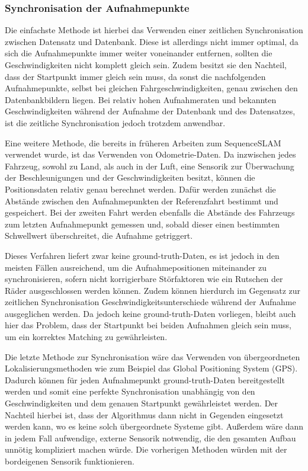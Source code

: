 \documentclass[12pt,a4paper,titlepage]{scrartcl}
\begin{document}
\subsubsection{Synchronisation der Aufnahmepunkte}
Die einfachste Methode ist hierbei das Verwenden einer zeitlichen Synchronisation zwischen Datensatz und Datenbank. Diese ist allerdings nicht immer optimal, da sich die Aufnahmepunkte immer weiter voneinander entfernen, sollten die Geschwindigkeiten nicht komplett gleich sein. Zudem besitzt sie den Nachteil, dass der Startpunkt immer gleich sein muss, da sonst die nachfolgenden Aufnahmepunkte, selbst bei gleichen Fahrgeschwindigkeiten, genau zwischen den Datenbankbildern liegen. Bei relativ hohen Aufnahmeraten und bekannten Geschwindigkeiten während der Aufnahme der Datenbank und des Datensatzes, ist die zeitliche Synchronisation jedoch trotzdem anwendbar.

Eine weitere Methode, die bereits in früheren Arbeiten zum SequenceSLAM verwendet wurde, ist das Verwenden von Odometrie-Daten. Da inzwischen jedes Fahrzeug, sowohl zu Land, als auch in der Luft, eine Sensorik zur Überwachung der Beschleunigungen und der Geschwindigkeiten besitzt, können die Positionsdaten relativ genau berechnet werden. Dafür werden zunächst die Abstände zwischen den Aufnahmepunkten der Referenzfahrt bestimmt und gespeichert. Bei der zweiten Fahrt werden ebenfalls die Abstände des Fahrzeugs zum letzten Aufnahmepunkt gemessen und, sobald dieser einen bestimmten Schwellwert überschreitet, die Aufnahme getriggert. 

Dieses Verfahren liefert zwar keine ground-truth-Daten, es ist jedoch in den meisten Fällen ausreichend, um die Aufnahmepositionen miteinander zu synchronisieren, sofern nicht korrigierbare Störfaktoren wie ein Rutschen der Räder ausgeschlossen werden können. Zudem können hierdurch im Gegensatz zur zeitlichen Synchronisation Geschwindigkeitsunterschiede während der Aufnahme ausgeglichen werden. Da jedoch keine ground-truth-Daten vorliegen, bleibt auch hier das Problem, dass der Startpunkt bei beiden Aufnahmen gleich sein muss, um ein korrektes Matching zu gewährleisten.

Die letzte Methode zur Synchronisation wäre das Verwenden von übergeordneten Lokalisierungsmethoden wie zum Beispiel das Global Positioning System (GPS). Dadurch können für jeden Aufnahmepunkt ground-truth-Daten bereitgestellt werden und somit eine perfekte Synchronisation unabhängig von den Geschwindigkeiten und dem genauen Startpunkt gewährleistet werden. Der Nachteil hierbei ist, dass der Algorithmus dann nicht in Gegenden eingesetzt werden kann, wo es keine solch übergeordnete Systeme gibt. Außerdem wäre dann in jedem Fall aufwendige, externe Sensorik notwendig, die den gesamten Aufbau unnötig kompliziert machen würde. Die vorherigen Methoden würden mit der bordeigenen Sensorik funktionieren. 
\end{document}
